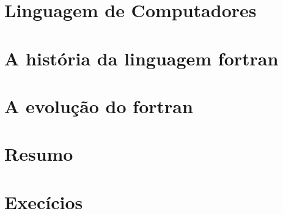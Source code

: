 \section{Linguagem de Computadores}
\begin{frame}
\end{frame}
\section{A história da linguagem fortran}
\begin{frame}
\end{frame}
\section{A evolução do fortran}
\begin{frame}
\end{frame}
\section{Resumo}
\begin{frame}
\end{frame}
\section{Execícios}
\begin{frame}
\end{frame}